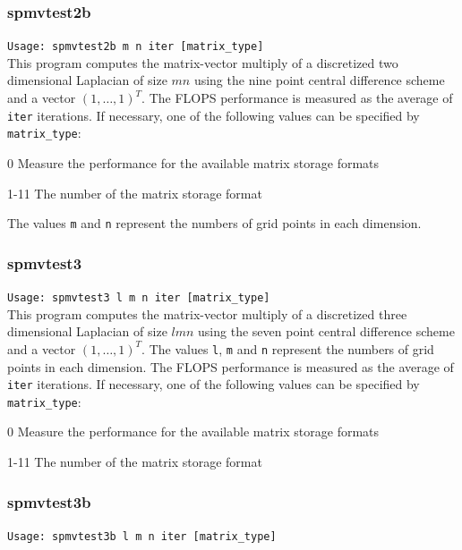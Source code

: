 \documentclass[a4paper]{article}
\newcommand{\namelistlabel}[1]{\mbox{#1}\hfill}
\newenvironment{namelist}[1]{%
\begin{list}{}
  {\let\makelabel\namelistlabel
  \settowidth{\labelwidth}{#1}
  \setlength{\leftmargin}{1.1\labelwidth}}
  }{%
\end{list}}
\begin{document}
\subsubsection{spmvtest2b}

\verb+Usage: spmvtest2b m n iter [matrix_type]+\\

This program computes the matrix-vector multiply of a 
discretized two dimensional Laplacian of size $mn$ using 
the nine point central difference scheme 
and a vector $(1,\dots,1)^T$. 
The FLOPS performance is measured as the average of {\tt iter}
iterations.
If necessary, one of the following values can be specified by {\tt matrix\_type}:
\begin{namelist}{XXXXXXXXXXXXXXXXXXXX}
\item[0] Measure the performance for the available matrix storage formats
\item[1-11] The number of the matrix storage format
\end{namelist}
The values {\tt m} and {\tt n} represent the numbers of grid points 
in each dimension. 

\subsubsection{spmvtest3}

\verb+Usage: spmvtest3 l m n iter [matrix_type]+\\

This program computes the matrix-vector multiply of a 
discretized three dimensional Laplacian of size $lmn$ using 
the seven point central difference scheme and a vector $(1,\dots,1)^T$. 
The values {\tt l}, {\tt m} and {\tt n} represent the numbers of grid
points in each dimension. 
The FLOPS performance is measured as the average of {\tt iter}
iterations.
If necessary, one of the following values can be specified by {\tt matrix\_type}:
\begin{namelist}{XXXXXXXXXXXXXXXXXXXX}
\item[0] Measure the performance for the available matrix storage formats
\item[1-11] The number of the matrix storage format
\end{namelist}

\subsubsection{spmvtest3b}

\verb+Usage: spmvtest3b l m n iter [matrix_type]+\\
\end{document}
